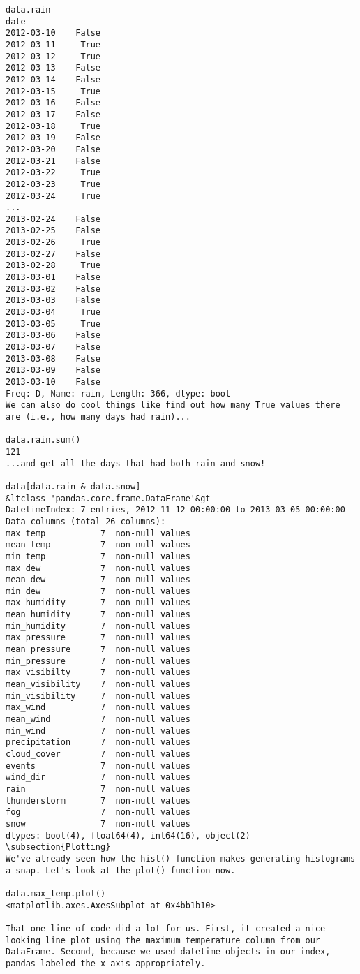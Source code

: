\begin{framed}
\begin{verbatim}
data.rain
date
2012-03-10    False
2012-03-11     True
2012-03-12     True
2012-03-13    False
2012-03-14    False
2012-03-15     True
2012-03-16    False
2012-03-17    False
2012-03-18     True
2012-03-19    False
2012-03-20    False
2012-03-21    False
2012-03-22     True
2012-03-23     True
2012-03-24     True
...
2013-02-24    False
2013-02-25    False
2013-02-26     True
2013-02-27    False
2013-02-28     True
2013-03-01    False
2013-03-02    False
2013-03-03    False
2013-03-04     True
2013-03-05     True
2013-03-06    False
2013-03-07    False
2013-03-08    False
2013-03-09    False
2013-03-10    False
Freq: D, Name: rain, Length: 366, dtype: bool
We can also do cool things like find out how many True values there are (i.e., how many days had rain)...

data.rain.sum()
121
...and get all the days that had both rain and snow!

data[data.rain & data.snow]
&ltclass 'pandas.core.frame.DataFrame'&gt
DatetimeIndex: 7 entries, 2012-11-12 00:00:00 to 2013-03-05 00:00:00
Data columns (total 26 columns):
max_temp           7  non-null values
mean_temp          7  non-null values
min_temp           7  non-null values
max_dew            7  non-null values
mean_dew           7  non-null values
min_dew            7  non-null values
max_humidity       7  non-null values
mean_humidity      7  non-null values
min_humidity       7  non-null values
max_pressure       7  non-null values
mean_pressure      7  non-null values
min_pressure       7  non-null values
max_visibilty      7  non-null values
mean_visibility    7  non-null values
min_visibility     7  non-null values
max_wind           7  non-null values
mean_wind          7  non-null values
min_wind           7  non-null values
precipitation      7  non-null values
cloud_cover        7  non-null values
events             7  non-null values
wind_dir           7  non-null values
rain               7  non-null values
thunderstorm       7  non-null values
fog                7  non-null values
snow               7  non-null values
dtypes: bool(4), float64(4), int64(16), object(2)
\subsection{Plotting}
We've already seen how the hist() function makes generating histograms a snap. Let's look at the plot() function now.

data.max_temp.plot()
<matplotlib.axes.AxesSubplot at 0x4bb1b10>

That one line of code did a lot for us. First, it created a nice looking line plot using the maximum temperature column from our DataFrame. Second, because we used datetime objects in our index, pandas labeled the x-axis appropriately.


\end{verbatim}
\end{framed}
